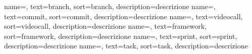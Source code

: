 {
  name=,
  text=branch,
  sort=branch,
  description={descrizione}
}
{
  name=,
  text=commit,
  sort=commit,
  description={descrizione}
}
{
  name=,
  text=videocall,
  sort=videocall,
  description={descrizione}
}
{
  name=,
  text=framework,
  sort=framework,
  description={descrizione}
}
{
  name=,
  text=sprint,
  sort=sprint,
  description={descrizione}
}
{
  name=,
  text=task,
  sort=task,
  description={descrizione}
}
